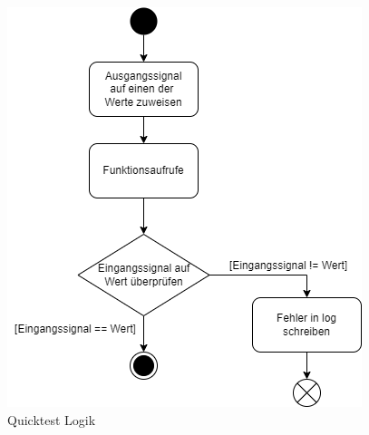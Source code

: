 \begin{figure}[h]
\centering
\includegraphics[scale=.6,]{Bilder/Quicktest/QuicktestLogik.drawio.png}
\caption{Quicktest Logik \parencite[]{quicktestc}}
\end{figure}















